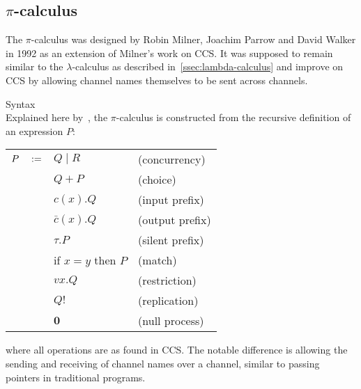 \subsection{\texorpdfstring{$\pi$-c}{Pi C}alculus}\label{subsec:pi-calculus}

    The $\pi$-calculus was designed by Robin Milner, Joachim Parrow and David Walker in 1992 as an extension of Milner's work on CCS.
    It was supposed to remain similar to the $\lambda$-calculus as described in~\ref{ssec:lambda-calculus} and improve on CCS by allowing channel names themselves to be sent across channels.


    \begin{definition}{Syntax\\}
        Explained here by~\cite{pi-calculus-intro}\footnotemark, the $\pi$-calculus is constructed from the recursive definition of an expression $P$:
        \begin{center} %
            \begin{tabular}{ l l l }
                $P \quad :=$    & $Q \; | \; R$         & (concurrency) \\
                                    & $Q + P$               & (choice) \\
                                    & $c(x).Q$              & (input prefix) \\
                                    & $\bar{c}(x).Q$        & (output prefix) \\
                                    & $\tau.P$              & (silent prefix) \\
                                    & if $x = y$ then $P$   & (match) \\
                                    & $vx.Q$                & (restriction)~\footnotemark\\
                                    & $Q!$                  & (replication)~\footnotemark\\
                                    & $\textbf{0}$          & (null process) \\
            \end{tabular}
        \end{center}
        \addtocounter{footnote}{-1}
        where all operations are as found in CCS.
        The notable difference is allowing the sending and receiving of channel names over a channel, similar to passing pointers in traditional programs.
    \end{definition}
